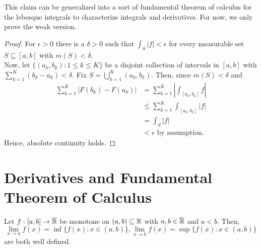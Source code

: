 This claim can be generalized into a sort of fundamental theorem of calculus for the lebesque integrals to characterize integrals and derivatives. For now, we only prove the weak version.
\begin{proof}
	For \(\epsilon > 0\) 	there is a \(\delta > 0\) such that \(\int _{S} \left| f \right| < \epsilon\) for every measurable set \(S \subseteq \left[ a, b \right] \) with \(m\left( S \right) < \delta\).\\
	Now, let \(\{\left( a_{k}, b_{k} \right) : 1 \le k \le K\} \) be a disjoint collection of intervals in \(\left[ a, b \right] \) with \(\sum_{k=1}^{K}\left( b_{k} - a_{k} \right) < \delta\). Fix \(S = \bigcup_{k=1} ^{K}\left( a_{k}, b_{k} \right) \). Then, since \(m\left( S \right)  < \delta\) and
	\begin{align*}
		\sum_{k=1}^{K} \left| F\left( b_{k} \right)  - F\left( a_{k} \right)  \right| &=  \sum_{k=1}^{K} \left| \int_{\left[ a_{k}, b_{k} \right] } f \right|  \\
											      &\le \sum_{k=1}^{K}  \int_{\left[ a_{k}, b_{k} \right] } \left| f \right| \\
											      &= \int_{S} \left| f \right|   \\
											      &< \epsilon \text{ by assumption}
	.\end{align*}
	Hence, absolute continuity holds.
\end{proof}
\section{Derivatives and Fundamental Theorem of Calculus}
\begin{proposition}
	Let \(f: \left[ a, b \right]  \to \overline{\mathbb{R}}\) be monotone on \(\left( a, b \right) \subseteq \mathbb{R}\) with \(a, b \in \overline{\mathbb{R}}\) and  \(a < b\). Then,  \[\lim_{x \to a} f\left( x \right) = \inf \{ f\left( x \right)  : x \in \left( a, b \right)  \}  , \lim_{x \to b}f\left( x \right) = \sup \{ f\left( x \right)  : x \in \left( a, b \right)   \}  \] are both well defined.
\end{proposition}
